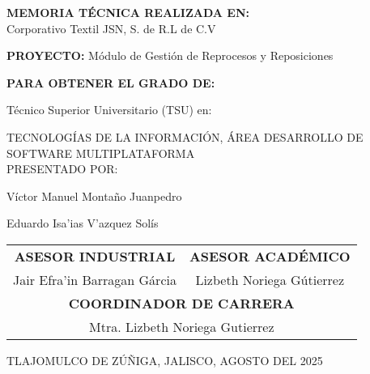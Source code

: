 \documentclass[12pt,letterpaper,spanish]{report}
\begin{document}
\begin{center}

\large{\textbf{MEMORIA TÉCNICA REALIZADA EN:}}
 \\  Corporativo Textil JSN, S. de R.L de C.V

\centerline{\hbox{}}

\large{\textbf{PROYECTO:} Módulo de Gestión de Reprocesos y Reposiciones}

\vspace{0.1in}
\large{\textbf{PARA OBTENER EL GRADO DE:}}

\large{Técnico Superior Universitario (TSU) en:}
\vspace{0.05in}

\large{TECNOLOGÍAS DE LA INFORMACIÓN, ÁREA DESARROLLO DE SOFTWARE MULTIPLATAFORMA }
\\
\large{PRESENTADO POR:}


Víctor Manuel Montaño Juanpedro %


Eduardo Isa'ias V'azquez Solís %

\vspace{0.2in}

\begin{tabular}{cc}
    \vspace{0.2in}
    \textbf{ASESOR INDUSTRIAL} & \textbf{ASESOR ACADÉMICO} \\

    Jair Efra'in Barragan Gárcia & Lizbeth Noriega Gútierrez \\
    \multicolumn{2}{c}{\textbf{COORDINADOR DE CARRERA}
    \vspace{0.2in}
    } \\

    \multicolumn{2}{c}{
            Mtra. Lizbeth Noriega Gutierrez }
    \end{tabular}

\end{center}
\begin{flushright}\small{ TLAJOMULCO DE ZÚÑIGA, JALISCO, AGOSTO DEL 2025} \end{flushright}

\newpage


\end{document}
